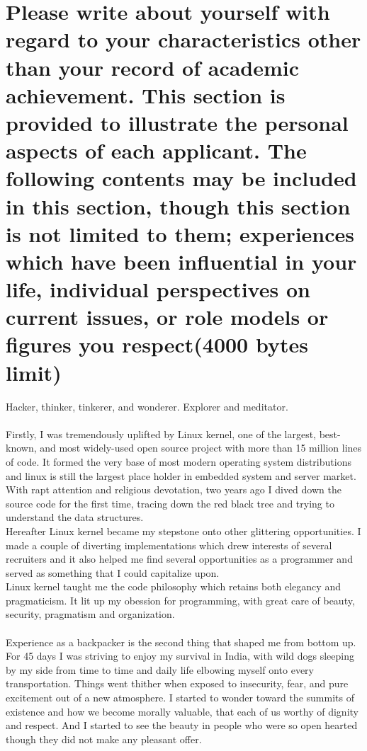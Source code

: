 \documentclass{article}
\begin{document}
\section{Please write about yourself with regard to your characteristics other than your record of academic achievement. This section is provided to illustrate the personal aspects of each applicant. The following contents may be included in this section, though this section is not limited to them; experiences which have been influential in your life, individual perspectives on current issues, or role models or figures you respect(4000 bytes limit)}

Hacker, thinker, tinkerer, and wonderer. Explorer and meditator. \\
\\
Firstly, I was tremendously uplifted by Linux kernel, one of the largest, best-known, and most widely-used open source project with more than 15 million lines of code. It formed the very base of most modern operating system distributions and linux is still the largest place holder in embedded system and server market. With rapt attention and religious devotation, two years ago I dived down the source code for the first time, tracing down the red black tree and trying to understand the data structures. \\
Hereafter Linux kernel became my stepstone onto other glittering opportunities. I made a couple of diverting implementations which drew interests of several recruiters and it also helped me find several opportunities as a programmer and served as something that I could capitalize upon.\\
Linux kernel taught me the code philosophy which retains both elegancy and pragmaticism. It lit up my obession for programming, with great care of beauty, security, pragmatism and organization.\\
\\
Experience as a backpacker is the second thing that shaped me from bottom up. \\
For 45 days I was striving to enjoy my survival in India, with wild dogs sleeping by my side from time to time and daily life elbowing myself onto every transportation. Things went thither when exposed to insecurity, fear, and pure excitement out of a new atmosphere. I started to wonder toward the summits of existence and how we become morally valuable, that each of us worthy of dignity and respect. And I started to see the beauty in people who were so open hearted though they did not make any pleasant offer. \\
\end{document}

